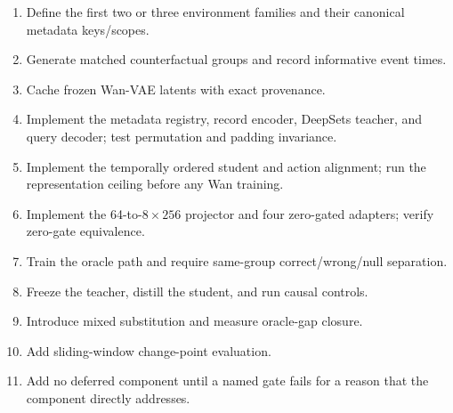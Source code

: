 \documentclass[11pt]{article}
\begin{document}
\begin{enumerate}
  \item Define the first two or three environment families and their canonical
  metadata keys/scopes.
  \item Generate matched counterfactual groups and record informative event times.
  \item Cache frozen Wan-VAE latents with exact provenance.
  \item Implement the metadata registry, record encoder, DeepSets teacher, and
  query decoder; test permutation and padding invariance.
  \item Implement the temporally ordered student and action alignment; run the
  representation ceiling before any Wan training.
  \item Implement the 64-to-$8\times256$ projector and four zero-gated adapters;
  verify zero-gate equivalence.
  \item Train the oracle path and require same-group correct/wrong/null separation.
  \item Freeze the teacher, distill the student, and run causal controls.
  \item Introduce mixed substitution and measure oracle-gap closure.
  \item Add sliding-window change-point evaluation.
  \item Add no deferred component until a named gate fails for a reason that the
  component directly addresses.
\end{enumerate}
\end{document}
